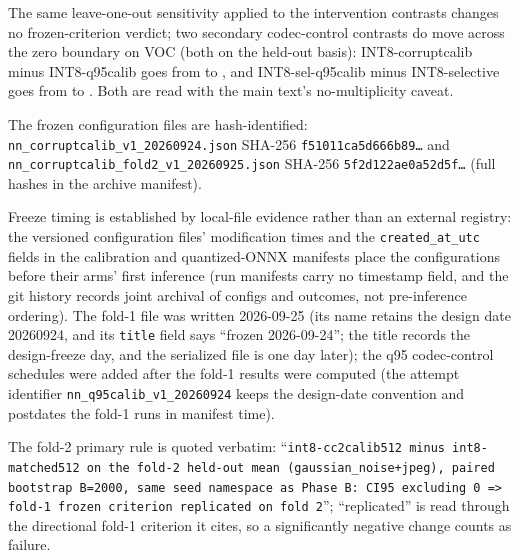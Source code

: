 \documentclass[10pt]{article}
\newcommand{\Jclean}{\mathrm{J95}}
\newcommand{\sigstar}{\textsuperscript{*}}
\begin{document}
The same leave-one-out sensitivity applied to the intervention contrasts
changes no frozen-criterion verdict; two secondary codec-control contrasts do
move across the zero boundary on VOC (both on the held-out basis):
INT8-corruptcalib minus INT8-q95calib goes from \nnCcQHVoc{} to
\nnCcQHxVoc{}, and INT8-sel-q95calib minus INT8-selective goes from
\nnSqqHVoc{} to \nnSqqHxVoc{}. Both are read with the
main text's no-multiplicity caveat.

{\sloppy The frozen configuration files are hash-identified:
\texttt{nn\_corruptcalib\_v1\_20260924.json} SHA-256
\texttt{f51011ca5d666b89\ldots} and
\texttt{nn\_corruptcalib\_fold2\_v1\_20260925.json} SHA-256
\texttt{5f2d122ae0a52d5f\ldots} (full hashes in the archive manifest).\par}
Freeze timing is established by local-file evidence rather than an external
registry: the versioned configuration files' modification times and the
\texttt{created\_at\_utc} fields in the calibration and quantized-ONNX
manifests
place the configurations before their arms' first inference (run manifests
carry no timestamp field, and the git history records joint archival of
configs and outcomes, not pre-inference ordering). The fold-1
file was written 2026-09-25 (its name retains the design date 20260924, and
its \texttt{title} field says ``frozen 2026-09-24''; the title records the
design-freeze day, and the serialized file is one day later);
the q95 codec-control schedules were added after the fold-1 results were
computed (the attempt identifier \texttt{nn\_q95calib\_v1\_20260924} keeps
the design-date convention and postdates the fold-1 runs in manifest time).
{\sloppy The fold-2 primary rule is quoted verbatim:
``\texttt{int8-cc2calib512 minus int8-matched512 on the fold-2 held-out mean
(gaussian\_noise+jpeg), paired bootstrap B=2000, same seed namespace as
Phase B: CI95 excluding 0 => fold-1 frozen criterion replicated on
fold 2}''; ``replicated'' is read through the directional fold-1 criterion
it cites, so a significantly negative change counts as failure.\par}

\begin{table}[h]
\centering
\caption{Per-family $\Delta E$ (AP points; family-mean FP8$-$INT8 gap minus
$\Jclean$ gap) and the leave-one-out $\Delta E$ excluding
\texttt{motion\_blur-s5}, per dataset$\times$model block. \sigstar{}: unadjusted 95\%
paired-bootstrap interval excludes zero.}
\label{tab:supp-perfamily}
\small

\end{table}
\end{document}
